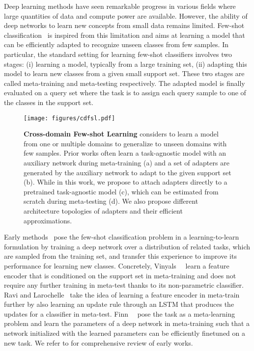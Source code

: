 
Deep learning methods have seen remarkable progress in various fields where large quantities of data and compute power are available.
However, the ability of deep networks to learn new concepts from small data remains limited.
Few-shot classification~\cite{lake2011one,miller2000learning} is inspired from this limitation and aims at learning a model that can be efficiently adapted to recognize unseen classes from few samples.
In particular, the standard setting for learning few-shot classifiers involves two stages: (i) learning a model, typically from a large training set, (ii) adapting this model to learn new classes from a given small support set. 
These two stages are called meta-training and meta-testing respectively.
The adapted model is finally evaluated on a query set where the task is to assign each query sample to one of the classes in the support set.

\begin{figure}
\begin{center}
\texttt{[image: figures/cdfsl.pdf]}
\end{center}
\vspace{-0.45cm}
\caption{\textbf{Cross-domain Few-shot Learning} considers to learn a model from one or multiple domains to generalize to unseen domains with few samples. Prior works often learn a task-agnostic model with an auxiliary network during meta-training (a) and a set of adapters are generated by the auxiliary network to adapt to the given support set (b). While in this work, we propose to attach adapters directly to a pretrained task-agnostic model (c), which can be estimated from scratch during meta-testing (d). We also propose different architecture topologies of adapters and their efficient approximations. 
}
\label{fig:cdfsl}
\end{figure}


Early methods~\cite{vinyals2016matching,ravi2016optimization,finn2017model,oreshkin2018tadam,rusu2018meta,snell2017prototypical} pose the few-shot classification problem in a learning-to-learn formulation by training a deep network over a distribution of related tasks, which are sampled from the training set, and transfer this experience to improve its performance for learning new classes.
Concretely, Vinyals~\etal~\cite{vinyals2016matching} learn a feature encoder that is conditioned on the support set in meta-training and does not require any further training in meta-test thanks to its non-parametric classifier.
Ravi and Larochelle~\cite{ravi2016optimization} take the idea of learning a feature encoder in meta-train further by also learning an update rule through an LSTM that produces the updates for a classifier in meta-test.
Finn~\etal~\cite{finn2017model} pose the task as a meta-learning problem and learn the parameters of a deep network in meta-training such that a network initialized with the learned parameters can be efficiently finetuned on a new task.
We refer to \cite{wang2020generalizing, hospedales2020meta} for comprehensive review of early works.


